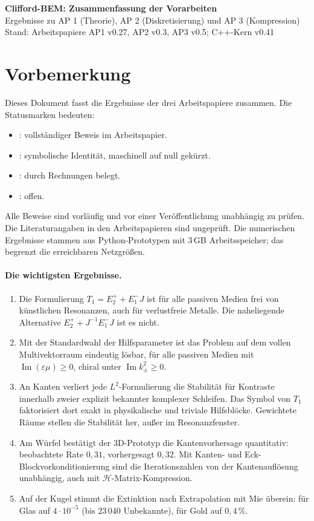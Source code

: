 \documentclass[11pt, a4paper]{article}
\newcommand{\st}[1]{{\small\sffamily[#1]}}
\begin{document}
\begin{center}
  \sffamily
  {\Large\textbf{Clifford-BEM: Zusammenfassung der Vorarbeiten}}\\[0.3cm]
  {\large Ergebnisse zu AP 1 (Theorie), AP 2 (Diskretisierung) und AP 3 (Kompression)}\\[0.3cm]
  {\small Stand: Arbeitspapiere AP1 v0.27, AP2 v0.3, AP3 v0.5; C++-Kern v0.41}
\end{center}

\section*{Vorbemerkung}
Dieses Dokument fasst die Ergebnisse der drei Arbeitspapiere zusammen. Die Statusmarken
bedeuten:
\begin{itemize}[leftmargin=*]
  \item \st{bewiesen}: vollständiger Beweis im Arbeitspapier.
  \item \st{exakt}: symbolische Identität, maschinell auf null gekürzt.
  \item \st{numerisch}: durch Rechnungen belegt.
  \item \st{Vermutung}: offen.
\end{itemize}
Alle Beweise sind vorläufig und vor einer Veröffentlichung unabhängig zu prüfen. Die
Literaturangaben in den Arbeitspapieren sind ungeprüft. Die numerischen Ergebnisse stammen
aus Python-Prototypen mit 3\,GB Arbeitsspeicher; das begrenzt die erreichbaren Netzgrößen.

\paragraph{Die wichtigsten Ergebnisse.}
\begin{enumerate}[leftmargin=*]
  \item Die Formulierung $T_1=E_2^++E_1^-J$ ist für alle passiven Medien frei von
    künstlichen Resonanzen, auch für verlustfreie Metalle. Die naheliegende Alternative
    $E_2^++J^{-1}E_1^-J$ ist es nicht.
  \item Mit der \glqq Standardwahl\grqq{} der Hilfsparameter ist das Problem auf dem vollen
    Multivektorraum eindeutig lösbar, für alle passiven Medien mit
    $\operatorname{Im}(\varepsilon\mu)\ge0$, chiral unter $\operatorname{Im}k_\pm^2\ge0$.
  \item An Kanten verliert jede $L^2$-Formulierung die Stabilität für Kontraste innerhalb
    zweier explizit bekannter komplexer Schleifen. Das Symbol von $T_1$ faktorisiert dort
    exakt in physikalische und triviale Hilfsblöcke. Gewichtete Räume stellen die
    Stabilität her, außer im Resonanzfenster.
  \item Am Würfel bestätigt der 3D-Prototyp die Kantenvorhersage quantitativ: beobachtete
    Rate $0{,}31$, vorhergesagt $0{,}32$. Mit Kanten- und Eck-Blockvorkonditionierung
    sind die Iterationszahlen von der Kantenauflösung unabhängig, auch mit
    $\mathcal{H}$-Matrix-Kompression.
  \item Auf der Kugel stimmt die Extinktion nach Extrapolation mit Mie überein: für Glas
    auf $4\cdot10^{-5}$ (bis 23\,040 Unbekannte), für Gold auf $0{,}4\,\%$.
\end{enumerate}
\end{document}
